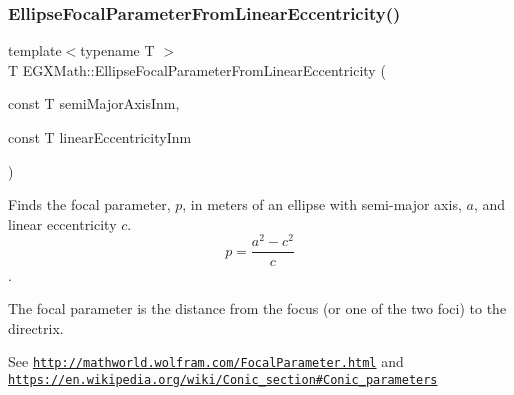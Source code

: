 \mbox{\label{group___e_g_x_math-_geometry-2_d-_ellipse-_focal_parameter_ga61d3b31a8a32b43634b2ea89a83bc6a5}} 
\subsubsection{\texorpdfstring{Ellipse\+Focal\+Parameter\+From\+Linear\+Eccentricity()}{EllipseFocalParameterFromLinearEccentricity()}}
{\footnotesize\ttfamily template$<$typename T $>$ \\
T E\+G\+X\+Math\+::\+Ellipse\+Focal\+Parameter\+From\+Linear\+Eccentricity (\begin{DoxyParamCaption}\item[{const T}]{semi\+Major\+Axis\+Inm,  }\item[{const T}]{linear\+Eccentricity\+Inm }\end{DoxyParamCaption})}



Finds the focal parameter, $p$, in meters of an ellipse with semi-\/major axis, $a$, and linear eccentricity $c$. \[ p=\frac{a^2-c^2}{c} \]. 

The focal parameter is the distance from the focus (or one of the two foci) to the directrix.

See \href{http://mathworld.wolfram.com/FocalParameter.html}{\tt http\+://mathworld.\+wolfram.\+com/\+Focal\+Parameter.\+html} and \href{https://en.wikipedia.org/wiki/Conic_section#Conic_parameters}{\tt https\+://en.\+wikipedia.\+org/wiki/\+Conic\+\_\+section\#\+Conic\+\_\+parameters}


